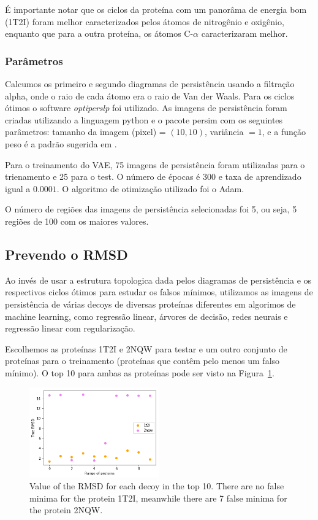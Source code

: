 É importante notar que os ciclos da proteína com um panorâma de energia bom (1T2I) foram melhor caracterizados
pelos átomos de nitrogênio e oxigênio, enquanto que para a outra proteína, os átomos C-$\alpha$ caracterizaram melhor.

\subsubsection{Parâmetros}

Calcumos os primeiro e segundo diagramas de persistência usando a filtração alpha, onde o raio de cada átomo
era o raio de Van der Waals. Para os ciclos ótimos o software \textit{optiperslp} foi utilizado. As imagens
de persistência foram criadas utilizando a linguagem python e o pacote persim \cite{scikittda2019} com
os seguintes parâmetros: tamanho da imagem (pixel) = $(10,10)$, variância $=1$, e a função peso é a padrão
sugerida em \cite{Adams2017}.

Para o treinamento do VAE, 75 imagens de persistência foram utilizadas para o trienamento e 25 para o test. O
número de épocas é 300 e taxa de aprendizado igual a $0.0001$. O algoritmo de otimização utilizado foi o Adam.

O número de regiões das imagens de persistência selecionadas foi 5, ou seja, 5 regiões de 100 com
os maiores valores.

\subsection{Prevendo o RMSD}

Ao invés de usar a estrutura topologica dada pelos diagramas de persistência e os respectivos ciclos ótimos para
estudar os falsos mínimos, utilizamos as imagens de persistência de várias decoys de diversas proteínas diferentes
em algorimos de machine learning, como regressão linear, árvores de decisão, redes neurais e regressão linear
com regularização.

Escolhemos as proteínas 1T2I e 2NQW para testar e um outro conjunto de proteínas para o treinamento (proteínas
que contêm pelo menos um falso mínimo). O top 10 para ambas as proteínas pode ser visto na Figura~\ref{fig:truermsd}.

\begin{figure}[!htbp]
    \centering
    \includegraphics[width=0.5\textwidth]{images/relatorio/true_rmsd.png}
    \caption{Value of the RMSD for each decoy in the top 10. There are no false minima for the protein 1T2I,
            meanwhile there are 7 false minima for the protein 2NQW.}
    \label{fig:truermsd}
    \fautor
\end{figure}

